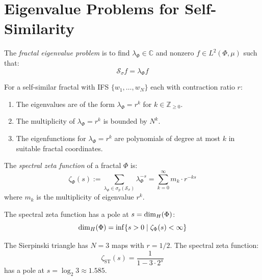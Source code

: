 \section{Eigenvalue Problems for Self-Similarity}

\begin{definition}
\label{def:frac-eigenvalue}
The \emph{fractal eigenvalue problem} is to find $\lambda_\Phi \in \mathbb{C}$
and nonzero $f \in L^2(\Phi, \mu)$ such that:
\[
    \mathcal{S}_\sigma f = \lambda_\Phi f
\]
\end{definition}

\begin{theorem}
\label{thm:eigenvalue-char}
For a self-similar fractal with IFS $\{w_1, \ldots, w_N\}$ each with
contraction ratio $r$:
\begin{enumerate}[label=(\alph*)]
    \item The eigenvalues are of the form $\lambda_\Phi = r^k$ for $k \in \mathbb{Z}_{\geq 0}$.
    \item The multiplicity of $\lambda_\Phi = r^k$ is bounded by $N^k$.
    \item The eigenfunctions for $\lambda_\Phi = r^k$ are polynomials of
          degree at most $k$ in suitable fractal coordinates.
\end{enumerate}
\end{theorem}

\begin{definition}
\label{def:spectral-zeta}
The \emph{spectral zeta function} of a fractal $\Phi$ is:
\[
    \zeta_\Phi(s) := \sum_{\lambda_\Phi \in \sigma_p(\mathcal{S}_\sigma)}
    \lambda_\Phi^{-s} = \sum_{k=0}^\infty m_k \cdot r^{-ks}
\]
where $m_k$ is the multiplicity of eigenvalue $r^k$.
\end{definition}

\begin{theorem}
\label{thm:zeta-dim}
The spectral zeta function has a pole at $s = \dim_H(\Phi)$:
\[
    \dim_H(\Phi) = \inf\{s > 0 \mid \zeta_\Phi(s) < \infty\}
\]
\end{theorem}

\begin{example}
\label{ex:sierpinski-spectrum}
The Sierpinski triangle has $N = 3$ maps with $r = 1/2$. The spectral zeta function:
\[
    \zeta_{\mathrm{ST}}(s) = \frac{1}{1 - 3 \cdot 2^s}
\]
has a pole at $s = \log_2 3 \approx 1.585$.
\end{example}

